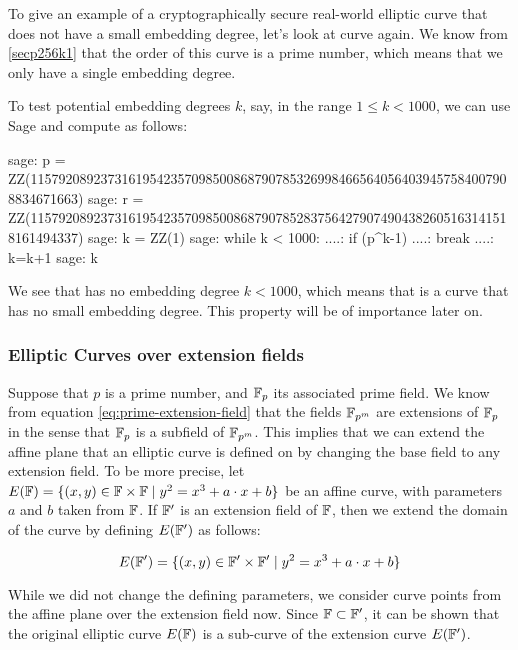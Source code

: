 \begin{example}
\label{ex:pairings_on_secp256k1}
 To give an example of a cryptographically secure real-world elliptic curve that does not have a small embedding degree, let's look at curve  again. We know from \examplename{} \ref{secp256k1} that the order of this curve is a prime number, which means that we only have a single embedding degree.

To test potential embedding degrees $k$, say, in the range $1\leq k < 1000$, we can use Sage and compute as follows:
\begin{sagecommandline}
sage: p = ZZ(115792089237316195423570985008687907853269984665640564039457584007908834671663)
sage: r = ZZ(115792089237316195423570985008687907852837564279074904382605163141518161494337)
sage: k = ZZ(1)
sage: while k < 1000:
....:     if (p^k-1)%
....:         break
....:     k=k+1
sage: k
\end{sagecommandline}
We see that  has no embedding degree $k<1000$, which means that   is a curve that has no small embedding degree. This property will be of importance later on.
\end{example}

\subsubsection{Elliptic Curves over extension fields}
\label{sec:curve-extensions}
 Suppose that $p$ is a prime number, and $\mathbb{F}_p$ its associated prime field. We know from equation \eqref{eq:prime-extension-field} that the fields $\mathbb{F}_{p^m}$ are extensions of $\mathbb{F}_p$ in the sense that $\mathbb{F}_{p}$ is a subfield of $\mathbb{F}_{p^m}$. This implies that we can extend the affine plane that an elliptic curve is defined on by changing the base field to any extension field. To be more precise, let 
$E(\mathbb{F})=\{ (x,y)\in \mathbb{F} \times \mathbb{F} \;|\; y^2 = x^3 +a\cdot x +b \}$ be an affine  curve, with parameters $a$ and $b$ taken from $\mathbb{F}$. If $\mathbb{F}'$ is an extension field of $\mathbb{F}$, then we extend the domain of the curve by defining $E(\mathbb{F}')$ as follows:

\begin{equation}\label{elliptic-curve-extension}
E(\mathbb{F}')=\{ (x,y)\in \mathbb{F}' \times \mathbb{F}' \;|\; y^2 = x^3 +a\cdot x +b \}
\end{equation}   

While we did not change the defining parameters, we consider curve points from the affine plane over the extension field now. Since $\mathbb{F}\subset \mathbb{F}'$, it can be shown that the original elliptic curve $E(\mathbb{F})$ is a sub-curve of the extension curve $E(\mathbb{F}')$.


